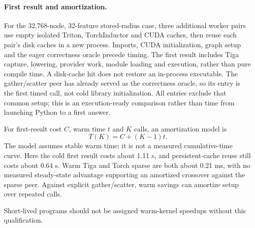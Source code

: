 \paragraph{First result and amortization.}
For the 32,768-node, 32-feature stored-radius case, three additional worker pairs
use empty isolated Triton, TorchInductor and CUDA caches, then reuse each pair's
disk caches in a new process. Imports, CUDA initialization, graph setup and the
eager correctness oracle precede timing. The first result includes Tiga capture,
lowering, provider work, module loading and execution, rather than pure compile
time. A disk-cache hit does not restore an in-process executable.
The gather/scatter peer has already served as the correctness oracle, so its
entry is the first timed call, not cold library initialization. All entries
exclude that common setup; this is an execution-ready comparison rather than
time from launching Python to a first answer.

\begin{table}[htbp]
\centering\small

\caption{First-result cost versus warm execution. First-result entries show
median and range of three fresh processes; warm entries are medians of process
medians. Common setup is excluded; the gather/scatter oracle is already warm.
Torch sparse uses its ordinary library environment.}
\label{tab:supplement-jit}
\end{table}

For first-result cost $C$, warm time $t$ and $K$ calls, an amortization model is
$$
T(K)=C+(K-1)t.
$$
The model assumes stable warm time; it is not a measured cumulative-time curve.
Here the cold first result costs about 1.11 s, and persistent-cache reuse still
costs about 0.64 s. Warm Tiga and Torch sparse are both about 0.21 ms, with no
measured steady-state advantage supporting an amortized crossover against the
sparse peer. Against explicit gather/scatter, warm savings can amortize setup
over repeated calls.

Short-lived programs should not be assigned warm-kernel
speedups without this qualification.
\FloatBarrier
